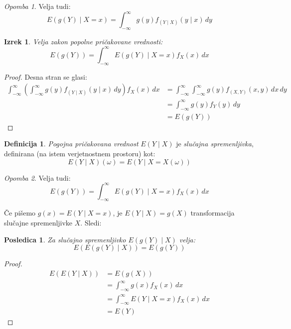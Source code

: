 \documentclass[12pt]{book}
\def\n{\noindent}
\theoremstyle{definition}
\newtheorem{definicija}{Definicija}
\theoremstyle{plain}
\newtheorem{izrek}{Izrek}
\theoremstyle{plain}
\theoremstyle{plain}
\newtheorem{posledica}{Posledica}
\theoremstyle{remark}
\newtheorem*{opomba}{Opomba}
\begin{document}
\begin{opomba}
    Velja tudi: 
    $$
    E(g(Y) \mid X=x)=\int_{-\infty}^{\infty} g(y) f_{(Y \mid X)}(y \mid x) \, d y
    $$
\end{opomba}

\begin{izrek}
    Velja zakon popolne pričakovane vrednosti:
    $$
    E(g(Y))=\int_{-\infty}^{\infty} E(g(Y) \mid X=x) f_X(x)\, d x
    $$
\end{izrek}

\begin{proof}
    Desna stran se glasi:
    $$
    \begin{aligned}
        \int_{-\infty}^{\infty}\left(\int_{-\infty}^{\infty} g(y) f_{(Y \mid X)}(y \mid x)\,  d y\right) f_X(x) \, d x&=\int_{-\infty}^{\infty} \int_{-\infty}^{\infty} g(y) f_{(X, Y)}(x, y) \, d x \, d y \\
        &=\int_{-\infty}^{\infty} g(y) f_Y(y) \, d y \\
        &=E(g(Y))
    \end{aligned}
    $$
\end{proof}

\begin{definicija}
    \emph{Pogojna pričakovana vrednost} $E(Y \mid X)$ je \emph{slučajna spremenljivka}, definirana (na istem verjetnostnem prostoru) kot: 
    $$
    E(Y \mid X)(\omega)=E(Y \mid X=X(\omega))
    $$
\end{definicija}

\begin{opomba}
    Velja tudi: 
    $$
    E(g(Y))=\int_{-\infty}^{\infty} E(g(Y) \mid X=x) f_X(x) \, d x
    $$
\end{opomba}

\n Če pišemo $g(x)=E(Y \mid X=x)$, je $E(Y \mid X)=g(X)$ transformacija slučajne spremenljivke $X$. Sledi:

\begin{posledica}
    Za slučajno spremenljivko $E(g(Y) \mid X)$ velja: 
    $$
    E(E(g(Y) \mid X))=E(g(Y))
    $$
\end{posledica}

\begin{proof}
    $$
    \begin{aligned}
        E(E(Y \mid X))&=E(g(X)) \\
        &=\int_{-\infty}^{\infty} g(x) f_X(x) \, d x \\
        &=\int_{-\infty}^{\infty} E(Y \mid X=x) f_X(x) \, d x \\
        &=E(Y)
    \end{aligned}
    $$    
\end{proof}
\end{document}
